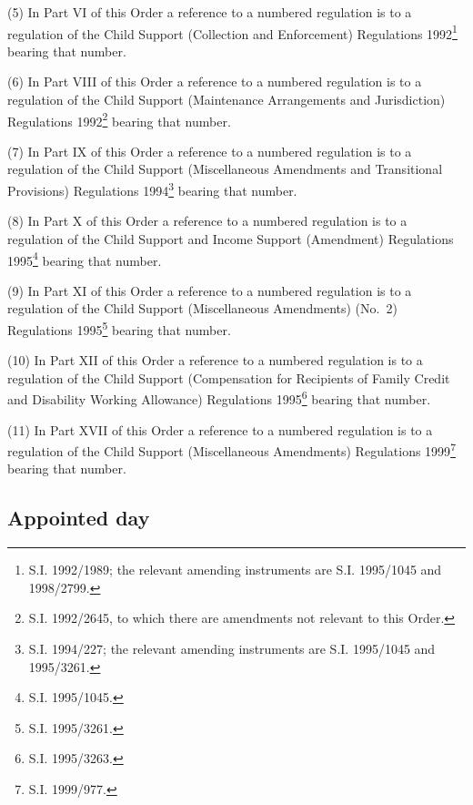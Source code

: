 \documentclass[12pt,a4paper]{article}
\begin{document}
(5) In Part VI of this Order a reference to a numbered regulation is to a regulation of the Child Support (Collection and Enforcement) Regulations 1992\footnote{\frenchspacing S.I. 1992/1989; the relevant amending instruments are S.I. 1995/1045 and 1998/2799.} bearing that number.

(6) In Part VIII of this Order a reference to a numbered regulation is to a regulation of the Child Support (Maintenance Arrangements and Jurisdiction) Regulations 1992\footnote{\frenchspacing S.I. 1992/2645, to which there are amendments not relevant to this Order.} bearing that number.

(7) In Part IX of this Order a reference to a numbered regulation is to a regulation of the Child Support (Miscellaneous Amendments and Transitional Provisions) Regulations 1994\footnote{\frenchspacing S.I. 1994/227; the relevant amending instruments are S.I. 1995/1045 and 1995/3261.} bearing that number.

(8) In Part X of this Order a reference to a numbered regulation is to a regulation of the Child Support and Income Support (Amendment) Regulations 1995\footnote{\frenchspacing S.I. 1995/1045.} bearing that number.

(9) In Part XI of this Order a reference to a numbered regulation is to a regulation of the Child Support (Miscellaneous Amendments) (No.\ 2) Regulations 1995\footnote{\frenchspacing S.I. 1995/3261.} bearing that number.

(10) In Part XII of this Order a reference to a numbered regulation is to a regulation of the Child Support (Compensation for Recipients of Family Credit and Disability Working Allowance) Regulations 1995\footnote{\frenchspacing S.I. 1995/3263.} bearing that number.

(11) In Part XVII of this Order a reference to a numbered regulation is to a regulation of the Child Support (Miscellaneous Amendments) Regulations 1999\footnote{\frenchspacing S.I. 1999/977.} bearing that number.

\subsection[2. Appointed day]{Appointed day}
\end{document}
